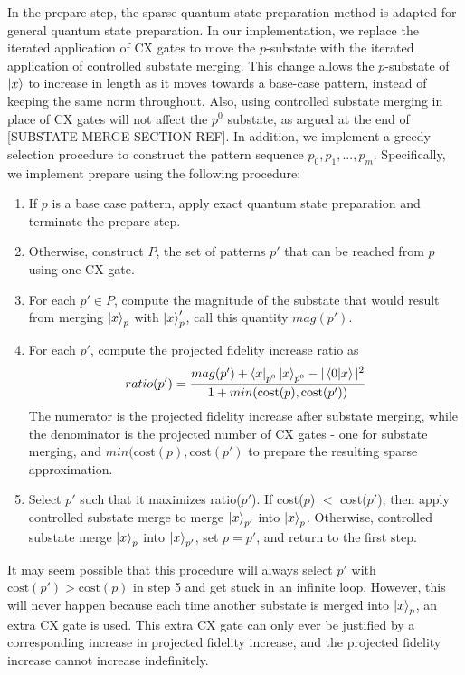 \documentclass{article}
\begin{document}
In the prepare step, the sparse quantum state preparation method is adapted for
general quantum state preparation. In our implementation, we replace the
iterated application of CX gates to move the $p$-substate with the iterated
application of controlled substate merging. This change allows the $p$-substate
of $\mathinner{|{x}\rangle}$ to increase in length as it moves towards a base-case pattern,
instead of keeping the same norm throughout. Also, using controlled substate
merging in place of CX gates will not affect the $p^0$ substate, as argued
at the end of [SUBSTATE MERGE SECTION REF]. In addition, we implement a greedy
selection procedure to construct the pattern sequence $p_0, p_1, ..., p_m$.
Specifically, we implement prepare using the following procedure:
\begin{enumerate}
\item If $p$ is a base case pattern, apply exact quantum state
preparation and terminate the prepare step.
\item Otherwise, construct $P$, the set of patterns $p'$ that can be
reached from $p$ using one CX gate.
\item For each $p' \in P$, compute the magnitude of the substate that would
result from merging $\mathinner{|{x}\rangle}_p$ with $\mathinner{|{x}\rangle}_p'$, call this quantity $mag(p')$.
\item For each $p'$, compute the projected fidelity increase ratio as
$$ratio(p') = \frac{mag(p') + \mathinner{\langle{x}|}_{p^0}\mathinner{|{x}\rangle}_{p^0} - |\mathinner{\langle{0|x}\rangle}|^2}{1 + min(\text{cost}(p), \text{cost}(p'))}$$
The numerator is the projected fidelity increase after substate merging, while
the denominator is the projected number of CX gates - one for substate merging,
and $min(\text{cost}(p), \text{cost}(p')$ to prepare the resulting sparse approximation.
\item Select $p'$ such that it maximizes ratio($p'$). If cost($p$) $<$ cost($p'$),
then apply controlled substate merge to merge $\mathinner{|{x}\rangle}_{p'}$ into $\mathinner{|{x}\rangle}_p$.
Otherwise, controlled substate merge $\mathinner{|{x}\rangle}_{p}$ into $\mathinner{|{x}\rangle}_{p'}$, set
$p = p'$, and return to the first step.
\end{enumerate}
It may seem possible that this procedure will always select $p'$ with 
$\text{cost}(p') > \text{cost}(p)$ in step 5 and get stuck in an infinite loop.
However, this will never happen because each time another substate is merged
into $\mathinner{|{x}\rangle}_p$, an extra CX gate is used. This extra CX gate can only ever
be justified by a corresponding increase in projected fidelity increase, and
the projected fidelity increase cannot increase indefinitely.
\end{document}
